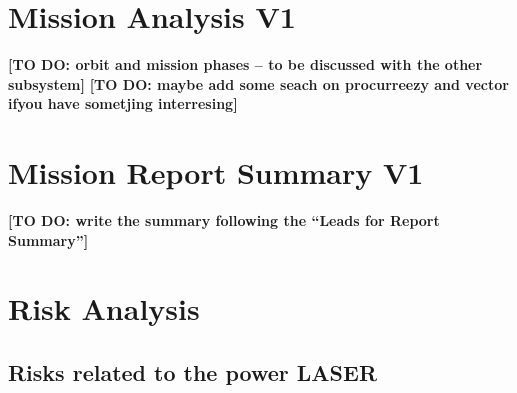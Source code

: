 \documentclass[11pt,a4paper]{article}
\newcommand{\todo}[1]{\textbf{[TO DO: #1]}}
\begin{document}
\section{Mission Analysis V1}

\todo{orbit and mission phases -- to be discussed with the other subsystem}
\todo{maybe add some seach on procurreezy and vector ifyou have sometjing interresing}

\section{Mission Report Summary V1}
\todo{write the summary following the ``Leads for Report Summary''}

\section{Risk Analysis}

\subsection{Risks related to the power LASER}
\end{document}
